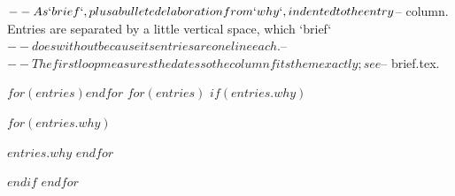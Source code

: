 $-- As `brief`, plus a bulleted elaboration from `why`, indented to the entry
$-- column. Entries are separated by a little vertical space, which `brief`
$-- does without because its entries are one line each.
$--
$-- The first loop measures the dates so the column fits them exactly; see
$-- brief.tex.
\begin{cvlisting}
$for(entries)$$endfor$
$for(entries)$
$if(entries.why)$
\begin{cvitems}
$for(entries.why)$
\item $entries.why$
$endfor$
\end{cvitems}
$endif$
\cventrysep
$endfor$
\end{cvlisting}
